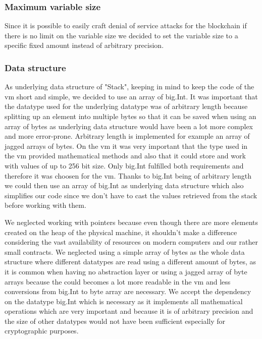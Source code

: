 \subsubsection{Maximum variable size}
Since it is possible to easily craft denial of service attacks for the blockchain if there is no limit on the variable size we decided to set the variable size to a specific fixed amount instead of arbitrary precision.

\subsubsection{Data structure}
As underlying data structure of "Stack", keeping in mind to keep the code of the vm short and simple, we decided to use an array of big.Int. It was important that the datatype used for the underlying datatype was of arbitrary length because splitting up an element into multiple bytes so that it can be saved when using an array of bytes as underlying data structure would have been a lot more complex and more error-prone. Arbitrary length is implemented for example an array of jagged arrays of bytes. On the vm it was very important that the type used in the vm provided mathematical methods and also that it could store and work with values of up to 256 bit size. Only big.Int fulfilled both requirements and therefore it was choosen for the vm. Thanks to big.Int being of arbitrary length we could then use an array of big.Int as underlying data structure which also simplifies our code since we don't have to cast the values retrieved from the stack before working with them.

We neglected working with pointers because even though there are more elements created on the heap of the physical machine, it shouldn't make a difference considering the vast availability of resources on modern computers and our rather small contracts. We neglected using a simple array of bytes as the whole data structure where different datatypes are read using a different amount of bytes, as it is common when having no abstraction layer or using a jagged array of byte arrays because the could becomes a lot more readable in the vm and less conversions from big.Int to byte array are necessary. We accept the dependency on the datatype big.Int which is necessary as it implements all mathematical operations which are very important and because it is of arbitrary precision and the size of other datatypes would not have been sufficient especially for cryptographic purposes.


